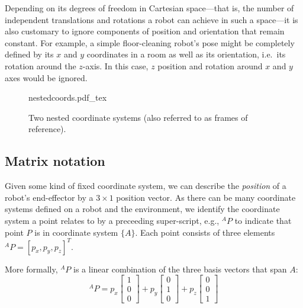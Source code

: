 Depending on its degrees of freedom in Cartesian space---that is, the number of independent translations and rotations a robot can achieve in such a space---it is also customary to ignore components of position and orientation that remain constant.
For example, a simple floor-cleaning robot's pose might be completely defined by its $x$ and $y$ coordinates in a room as well as its orientation, i.e.\ its rotation around the $z$-axis. In this case, $z$ position and rotation around $x$ and $y$ axes would be ignored.

\begin{figure}
    \centering
    \def\svgwidth{\textwidth}
    {nestedcoords.pdf_tex}
    \caption{Two nested coordinate systems (also referred to as frames of reference).}
    \label{fig:nestedcoords}
\end{figure}

\subsection{Matrix notation}
Given some kind of fixed coordinate system, we can describe the \emph{position} of a robot's end-effector by a $3\times1$ position vector.
As there can be many coordinate systems defined on a robot and the environment, we identify the coordinate system a point relates to by a preceeding super-script, e.g., $ ^AP$ to indicate that point $P$ is in coordinate system $\{A\}$.
Each point consists of three elements $ ^AP=[p_x, p_y, p_z]^T$.

More formally, $^AP$ is a linear combination of the three basis vectors that span $A$:
\begin{equation}
^AP=p_x\left[\begin{array}{c}1\\0\\0\end{array}\right]+p_y\left[\begin{array}{c}0\\1\\0\end{array}\right]+p_z\left[\begin{array}{c}0\\0\\1\end{array}\right]\label{eq:basis}
\end{equation}


